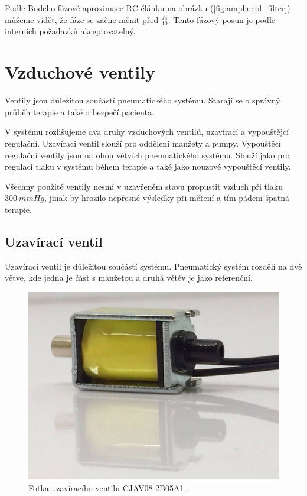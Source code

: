 Podle Bodeho fázové aproximace RC článku na obrázku (\ref{fig:amphenol_filter}) můžeme vidět, že fáze se začne měnit před $\frac{f_0}{10}$. Tento fázový posun je podle interních požadavků akceptovatelný.
\section{Vzduchové ventily}
Ventily jsou důležitou součástí pneumatického systému. Starají se o správný průběh terapie a také o bezpečí pacienta. \par
V systému rozlišujeme dva druhy vzduchových ventilů, uzavírací a vypouštějcí regulační. Uzavíraci ventil slouží pro oddělení manžety a pumpy. Vypouštěcí regulační ventily jsou na obou větvích pneumatického systému. Slouží jako pro regulaci tlaku v systému během terapie a také jako nouzové vypouštěcí ventily. \par
Všechny použité ventily nesmí v uzavřeném stavu propustit vzduch při tlaku $300 \ mmHg$, jinak by hrozilo nepřesné výsledky při měření a tím pádem špatná terapie.
\pagebreak
\subsection{Uzavírací ventil}
Uzavírací ventil je důležitou součástí systému. Pneumatický systém rozdělí na dvě větve, kde jedna je část s manžetou a druhá větěv je jako referenční. \par

\begin{figure}[H]
    \includegraphics[width=0.9\linewidth]{pictures/closing_valve.jpg}
    \caption{Fotka uzavíracího ventilu CJAV08-2B05A1. \cite{cite:UzaviraciVentil}}
    \label{fig:closing_valve}
\end{figure}

